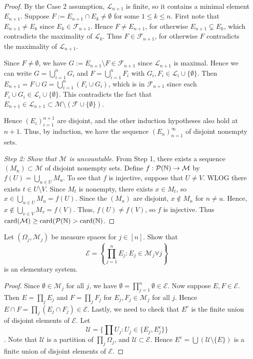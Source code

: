 \documentclass{article}
\begin{document}
\begin{proof}
By the Case 2 assumption, $\mathcal L_{n+1}$ is finite, so it contains a minimal element $E_{n+1}$.  Suppose $F := E_{n+1} \cap E_k \neq \emptyset$ for some $1\le k \le n$. First note that $E_{n+1} \neq E_k$ since $E_k \in \mathcal F_{n+1}$.  Hence $F \neq E_{n+1}$, for otherwise $E_{n+1} \subsetneq E_k$, which contradicts the maximality of $\mathcal L_k$. Thus $F \in \mathcal F_{n+1}$, for otherwise $F$ contradicts the maximality of $\mathcal L_{n+1}$.

Since $F \neq \emptyset$, we have $G := E_{n+1} \setminus F \in \mathcal F_{n+1}$ since $\mathcal L_{n+1}$ is maximal.  Hence we can write $G = \bigcup_{i=1}^n G_i$ and $F = \bigcup_{i=1}^n F_i$ with $G_i, F_i \in \mathcal L_i \cup \{\emptyset\}$. 
Then $E_{n+1} = F \cup G = \bigcup_{i=1}^n (F_i \cup G_i)$, which is in $\mathcal F_{n+1}$ since each $F_i \cup G_i \in \mathcal L_i \cup \{\emptyset\}$. This  contradicts the fact that $E_{n+1} \in \mathcal L_{n+1} \subset \mathcal M \setminus (\mathcal F \cup \{\emptyset\})$.

 Hence $(E_i)_{i=1}^{n+1}$ are disjoint, and the other induction hypotheses also hold at $n+1$. Thus, by induction, we have the sequence $(E_n)_{n=1}^\infty$ of disjoint nonempty sets.

\emph{Step 2: Show that $\mathcal M$ is uncountable.} 
From Step 1, there exists a sequence $(M_n) \subset \mathcal M$ of disjoint nonempty sets. Define $f : \mathcal P (\mathbb{N}) \to \mathcal M$ by $f(U) = \bigcup_{u \in U} M_u$.  To see that $f$ is injective, suppose that $U \neq V$.  WLOG there exists $t \in U \setminus V$.  Since $M_t$ is nonempty, there exists $x \in M_t$, so $x \in \bigcup_{u \in U} M_u = f(U) $. Since the $(M_n)$ are disjoint, $x \not\in M_n$ for $n \neq u$.  
Hence, $x \not\in \bigcup_{v\in V} M_v = f(V)$.  Thus, $f(U) \neq f(V)$, so $f$ is injective.  Thus $\operatorname{card}(\mathcal M) \ge \operatorname{card}(\mathcal P (\mathbb{N}) > \operatorname{card}(\mathbb{N})$.
\end{proof}


 Let $(\Omega_j , \mathcal M_j)$ be measure spaces for $j \in [n]$. Show that 
$$ \mathcal E = \left\{ \prod_{j=1}^n E_j : E_j \in \mathcal M_j \forall j \right\} $$
is an elementary system.

\begin{proof}
Since $\emptyset \in \mathcal M_j$ for all $j$, we have $\emptyset = \prod_{j=1}^n \emptyset \in \mathcal E$. Now suppose $E, F \in \mathcal E$. Then $E = \prod_j E_j$ and $F = \prod_j F_j$ for $E_j, F_j \in \mathcal M_j$ for all $j$. Hence $E \cap F = \prod_j (E_j \cap F_j) \in \mathcal E$.  Lastly, we need to check that $E^c$ is the finite union of disjoint elements of $\mathcal E$. Let 
$$\mathcal U = \{\prod U_j : U_j \in \{E_j, E_j^c \} \}$$.
Note that $\mathcal U$ is a partition of $\prod_j \Omega_j$, and $\mathcal U \subset \mathcal E$.  Hence $E^c = \bigcup (\mathcal U \setminus \{E\})$ is a finite union of disjoint elements of $\mathcal E$.
\end{proof}
\end{document}
